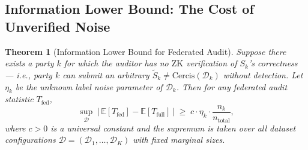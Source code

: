 \documentclass[12pt,a4paper]{article}
\newtheorem{theorem}{Theorem}[section]
\newcommand{\E}{\mathbb{E}}
\newcommand{\cD}{\mathcal{D}}
\newcommand{\Cercis}{\mathrm{Cercis}}
\newcommand{\ZK}{\mathrm{ZK}}
\begin{document}
\subsection{Information Lower Bound: The Cost of Unverified Noise}

\begin{theorem}[Information Lower Bound for Federated Audit]
\label{thm:info-lower}
Suppose there exists a party $k$ for which the auditor has \emph{no}
$\ZK$ verification of $S_k$'s correctness — i.e., party $k$ can submit
an arbitrary $\tilde{S}_k \neq \Cercis(\cD_k)$ without detection.  Let
$\eta_k$ be the unknown label noise parameter of $\cD_k$.  Then for any
federated audit statistic $T_{\mathrm{fed}}$,
\begin{equation}\label{eq:lower-bound}
    \sup_{\cD}\;
    \big|\,\E[T_{\mathrm{fed}}] - \E[T_{\mathrm{full}}]\,\big|
    \;\geq\; c \cdot \eta_k \cdot \frac{n_k}{n_{\mathrm{total}}},
\end{equation}
where $c > 0$ is a universal constant and the supremum is taken over all
dataset configurations $\cD = (\cD_1, \dots, \cD_K)$ with fixed marginal
sizes.
\end{theorem}
\end{document}
